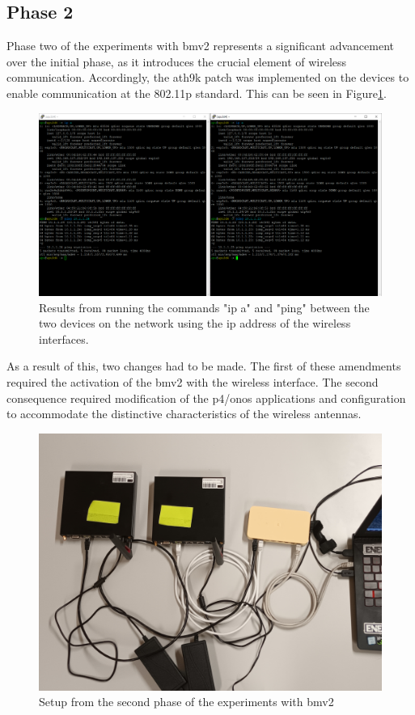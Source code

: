 \subsection{Phase 2}
Phase two of the experiments with \gls{bmv2} represents a significant advancement over the initial phase, as it introduces the crucial element of wireless communication. Accordingly, the ath9k patch was implemented on the devices to enable communication at the 802.11p standard. This can be seen in Figure\ref{fig:exp2_phase2_wireless}.

\begin{figure}
	\centering
	\includegraphics[width=\textwidth]{Chapters/Figures/tests/bmv2_phase_2/wireless_config_&_connectivity.PNG}
	\caption{Results from running the commands "ip a" and "ping" between the two devices on the network using the \gls{ip} address of the wireless interfaces.}
	\label{fig:exp2_phase2_wireless}
\end{figure}

As a result of this, two changes had to be made. The first of these amendments required the activation of the \gls{bmv2} with the wireless interface. The second consequence required modification of the \gls{p4}/\gls{onos} applications and configuration to accommodate the distinctive characteristics of the wireless antennas.

\begin{figure}
	\centering
	\includegraphics[width=\textwidth]{Chapters/Figures/tests/bmv2_phase_2/20241122_193213.jpg}
	\caption{Setup from the second phase of the experiments with \gls{bmv2}}
	\label{fig:exp2_phase2_setup}
\end{figure}

